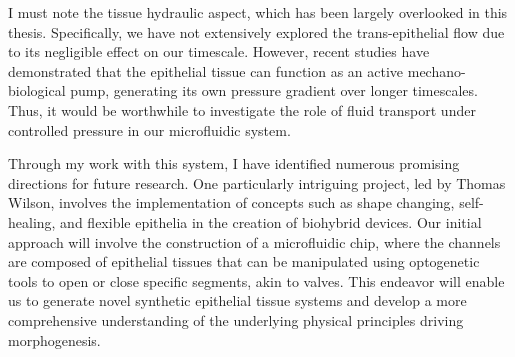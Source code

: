 I must note the tissue hydraulic aspect, which has been largely overlooked in this thesis. Specifically, we have not extensively explored the trans-epithelial flow due to its negligible effect on our timescale. However, recent studies have demonstrated that the epithelial tissue can function as an active mechano-biological pump, generating its own pressure gradient over longer timescales. Thus, it would be worthwhile to investigate the role of fluid transport under controlled pressure in our microfluidic system.

Through my work with this system, I have identified numerous promising directions for future research. One particularly intriguing project, led by Thomas Wilson, involves the implementation of concepts such as shape changing, self-healing, and flexible epithelia in the creation of biohybrid devices. Our initial approach will involve the construction of a microfluidic chip, where the channels are composed of epithelial tissues that can be manipulated using optogenetic tools to open or close specific segments, akin to valves. This endeavor will enable us to generate novel synthetic epithelial tissue systems and develop a more comprehensive understanding of the underlying physical principles driving morphogenesis.
